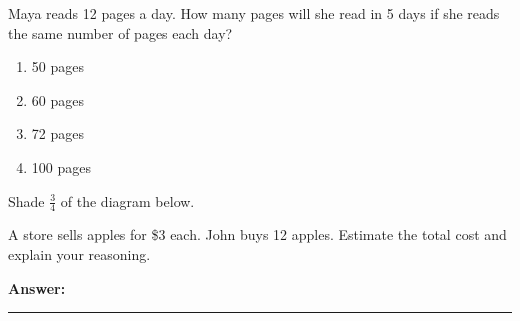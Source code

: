 \documentclass[12pt]{article}
\begin{document}
\begin{tcolorbox}[colframe=black!50, colback=white, title=\textbf{Problem 8}]
Maya reads 12 pages a day. How many pages will she read in 5 days if she reads the same number of pages each day?  

\begin{enumerate}[label=(\Alph*)]
    \item 50 pages
    \item 60 pages
    \item 72 pages
    \item 100 pages
\end{enumerate}
\end{tcolorbox}

\begin{tcolorbox}[colframe=black!50, colback=white, title=\textbf{Problem 9}]
Shade \(\frac{3}{4}\) of the diagram below.

\begin{center}
\end{center}
\end{tcolorbox}

\begin{tcolorbox}[colframe=black!50, colback=white, title=\textbf{Problem 10}]
A store sells apples for \$3 each. John buys 12 apples. Estimate the total cost and explain your reasoning.

\vspace{1cm}
\textbf{Answer:}  
\vspace{2cm}
\rule{0.7\textwidth}{0.4mm}
\end{tcolorbox}
\end{document}
